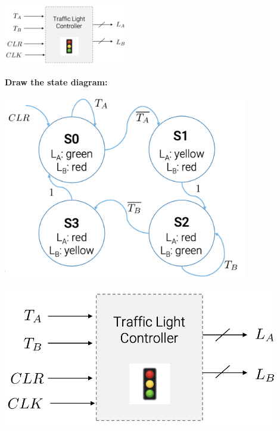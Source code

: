 \documentclass[12pt,openany]{book}
\begin{document}
\begin{center}
	\includegraphics[width=0.4\textwidth]{circuits/13.3_2.png}
\end{center}
\newpage

\begin{justify}
	\textbf{Draw the state diagram:}
\end{justify}
\vspace*{5px}

\begin{minipage}{0.45\textwidth}
\begin{center}
	\includegraphics[width=0.8\textwidth]{circuits/13.3_3.png}
\end{center}
\end{minipage}
\hfill
\vline
\hfill
\begin{minipage}{0.42\textwidth}
\begin{center}
	\includegraphics[width=0.9\textwidth]{circuits/13.3_2.png}
\end{center}
\end{minipage}
\end{document}
